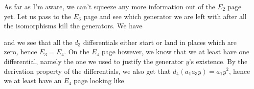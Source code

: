 
As far as I'm aware, we can't squeeze any more information out of the $E_2$ page yet. 
Let us pass to the $E_3$ page and see which generator we are left with after all the isomorphisms kill the generators. 
We have


and we see that all the $d_3$ differentials either start or land in places which are zero, 
hence $E_3 = E_4$. On the $E_4$ page however, 
we know that we at least have one differential, 
namely the one we used to justify the generator $y$'s existence. 
By the derivation property of the differentials, 
we also get that $d_4(a_1a_3y)=a_1y^2$, 
hence we at least have an $E_4$ page looking like


